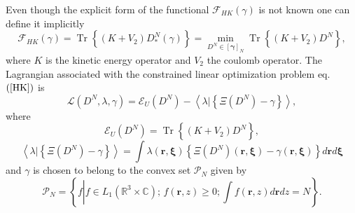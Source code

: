 \documentclass[aps,preprint]{revtex4}%
\begin{document}
Even though the explicit form of the functional $\mathcal{F}_{HK}\left(
\gamma\right)  $ is not known one can define it implicitly \cite{LevyLieb}
\begin{equation}
\mathcal{F}_{HK}\left(  \gamma\right)  =\operatorname{Tr}\left\{  \overset
{}{\left(  K+V_{2}\right)  D_{\ast}^{N}\left(  \gamma\right)  }\right\}
=\min_{D^{N}\in\left[  \mathbf{\gamma}\right]  _{N}}\operatorname{Tr}\left\{
\overset{}{\left(  K+V_{2}\right)  D^{N}}\right\}  , \label{HK}%
\end{equation}
where $K$ is the kinetic energy operator and $V_{2}$ the coulomb operator. The
Lagrangian associated with the constrained linear optimization problem eq.
$\left(  \ref{HK}\right)  $ is
\begin{equation}
\mathcal{L}\left(  D^{N},\lambda,\gamma\right)  =\mathcal{E}_{U}\left(
D^{N}\right)  -\left\langle \left.  \lambda\right\vert \left\{  \Xi\left(
D^{N}\right)  -\gamma\right\}  \right\rangle ,
\end{equation}
where%
\begin{equation}
\mathcal{E}_{U}\left(  D^{N}\right)  =\operatorname{Tr}\left\{  \overset
{}{\left(  K+V_{2}\right)  D^{N}}\right\}  ,
\end{equation}
\begin{equation}
\left\langle \left.  \lambda\right\vert \left\{  \Xi\left(  D^{N}\right)
-\gamma\right\}  \right\rangle =\int\lambda\left(  \mathbf{r,\xi}\right)
\left\{  \Xi\left(  D^{N}\right)  \left(  \mathbf{r,\xi}\right)
-\gamma\left(  \mathbf{r,\xi}\right)  \right\}  d\mathbf{r}d\mathbf{\xi}%
\end{equation}
and $\gamma$ is chosen to belong to the convex set $\mathcal{P}_{N}$ given by
\begin{equation}
\mathcal{P}_{N}=\left\{  f\left\vert f\in L_{1}\left(  \mathbb{R}^{3}%
\times\mathbb{C}\right)  ;\,f\left(  \mathbf{r,}z\right)  \geq0;\int f\left(
\mathbf{r,}z\right)  d\mathbf{r}dz=N\right.  \right\}  .
\end{equation}
\end{document}
